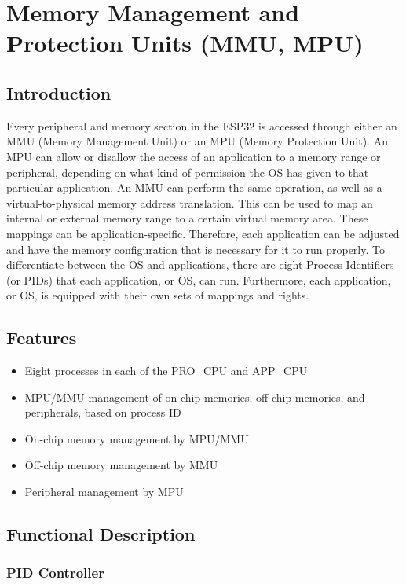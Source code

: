 \documentclass[main\_\_EN.tex]{subfiles}
\begin{document}
\hypertarget{mpummu}{}
\chapter{Memory Management and Protection Units (MMU, MPU)}
\label{mod:mmumpu}

\section{Introduction}
Every peripheral and memory section in the ESP32 is accessed through either an MMU (Memory Management Unit) or an MPU (Memory Protection Unit). An MPU can allow or disallow the access of an application to a memory range or peripheral, depending on what kind of permission the OS has given to that particular application. An MMU can perform the same operation, as well as a virtual-to-physical memory address translation. This can be used to map an internal or external memory range to a certain virtual memory area. These mappings can be application-specific. Therefore, each application can be adjusted and have the memory configuration that is necessary for it to run properly. To differentiate between the OS and applications, there are eight Process Identifiers (or PIDs) that each application, or OS, can run. Furthermore, each application, or OS, is equipped with their own sets of mappings and rights.

\section{Features}

\begin{itemize}
    \item Eight processes in each of the PRO\_CPU and APP\_CPU
    \item MPU/MMU management of on-chip memories, off-chip memories, and peripherals, based on process ID
    \item On-chip memory management by MPU/MMU
    \item Off-chip memory management by MMU
    \item Peripheral management by MPU
\end{itemize}


\section{Functional Description}

\subsection{PID Controller}
\end{document}
